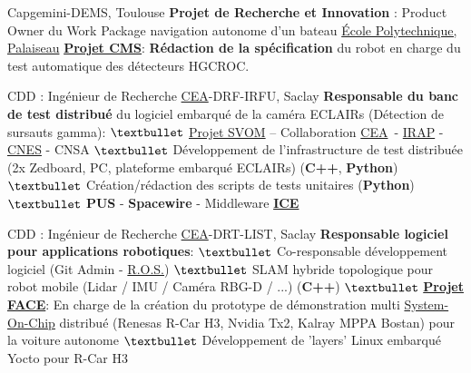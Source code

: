 \documentclass[
	a4paper,
]{fortysecondscv}
\newcommand{\cea}{\href{http://www.cea.fr/}{CEA}}
\newcommand{\ros}{\href{http://www.ros.org/}{R.O.S.}}
\begin{document}
\begin{cvtable}[2]
  {Capgemini-DEMS, Toulouse}
  {
    \textbf{Projet de Recherche et Innovation} : Product Owner du Work Package
    navigation autonome d'un bateau
  }
  {\href{https://www.polytechnique.edu/fr/le-laboratoire-leprince-ringuet-llr}{École Polytechnique, Palaiseau}}
  {
    \textbf{\href{http://polywww.in2p3.fr/-cms-45-?lang=fr}{Projet CMS}}:
    \textbf{Rédaction de la spécification} du robot en charge du test
    automatique des détecteurs HGCROC.
  }
  
  {CDD : Ingénieur de Recherche}
  {\cea-DRF-IRFU, Saclay}
  {
    \textbf{Responsable du banc de test distribué} du logiciel embarqué de la
    caméra ECLAIRs (Détection de sursauts gamma):\newline
    $\textbullet$ \href{http://www.svom.fr/}{Projet SVOM} -- Collaboration \cea\
    - \href{http://www.irap.omp.eu/}{IRAP} - \href{https://cnes.fr/fr}{CNES} - CNSA\newline
    $\textbullet$ Développement de l'infrastructure de test distribuée (2x Zedboard, PC,
    plateforme embarqué ECLAIRs) (\textbf{C++}, \textbf{Python})\newline
    $\textbullet$ Création/rédaction des scripts de tests unitaires
    (\textbf{Python})\newline
    $\textbullet$ \textbf{PUS} - \textbf{Spacewire} - Middleware
    \href{https://zeroc.com/products/ice}{\textbf{ICE}}
  }
  
  {CDD : Ingénieur de Recherche}
  {\cea-DRT-LIST, Saclay}
  {
    \textbf{Responsable logiciel pour applications robotiques}:\newline
    $\textbullet$ Co-responsable développement logiciel (Git Admin - \ros)\newline
    $\textbullet$ SLAM hybride topologique pour robot mobile (Lidar / IMU / Caméra RBG-D
    / ...) (\textbf{C++})\newline
    $\textbullet$ \textbf{\href{https://www.designspot.fr/portfolio/face/}{Projet
        FACE}}: En charge de la création du prototype de démonstration multi
    \href{https://en.wikipedia.org/wiki/System_on_a_chip}{System-On-Chip}
    distribué (Renesas R-Car H3, Nvidia Tx2, Kalray MPPA Bostan) pour la voiture
    autonome\newline 
    $\textbullet$ Développement de 'layers' Linux embarqué Yocto pour R-Car H3
  }
  

\end{cvtable}
\end{document}
